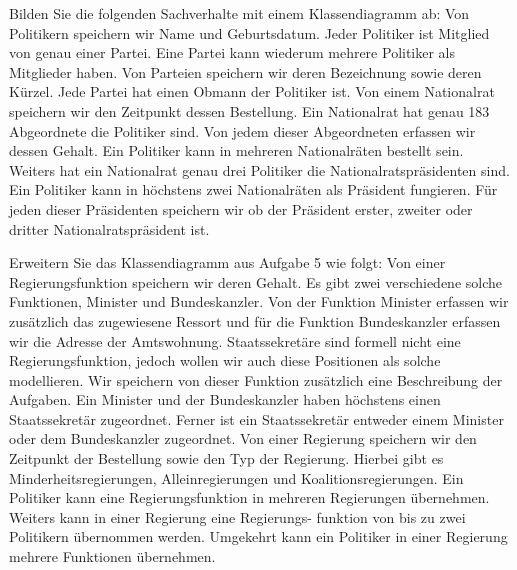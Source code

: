 \documentclass[a4paper, 12pt, margins=2cm]{homework}
\begin{document}
  \begin{problem}
    Bilden Sie die folgenden Sachverhalte mit einem Klassendiagramm ab:
Von Politikern speichern wir Name und Geburtsdatum. Jeder Politiker ist Mitglied von genau einer Partei. Eine
Partei kann wiederum mehrere Politiker als Mitglieder haben. Von Parteien speichern wir deren Bezeichnung
sowie deren Kürzel. Jede Partei hat einen Obmann der Politiker ist. Von einem Nationalrat speichern wir den
Zeitpunkt dessen Bestellung. Ein Nationalrat hat genau 183 Abgeordnete die Politiker sind. Von jedem dieser
Abgeordneten erfassen wir dessen Gehalt. Ein Politiker kann in mehreren Nationalräten bestellt sein. Weiters
hat ein Nationalrat genau drei Politiker die Nationalratspräsidenten sind. Ein Politiker kann in höchstens zwei
Nationalräten als Präsident fungieren. Für jeden dieser Präsidenten speichern wir ob der Präsident erster, zweiter
oder dritter Nationalratspräsident ist.

Erweitern Sie das Klassendiagramm aus Aufgabe 5 wie folgt:
Von einer Regierungsfunktion speichern wir deren Gehalt. Es gibt zwei verschiedene solche Funktionen, Minister und Bundeskanzler. Von der Funktion Minister erfassen wir zusätzlich das zugewiesene Ressort und für
die Funktion Bundeskanzler erfassen wir die Adresse der Amtswohnung. Staatssekretäre sind formell nicht eine
Regierungsfunktion, jedoch wollen wir auch diese Positionen als solche modellieren. Wir speichern von dieser
Funktion zusätzlich eine Beschreibung der Aufgaben. Ein Minister und der Bundeskanzler haben höchstens
einen Staatssekretär zugeordnet. Ferner ist ein Staatssekretär entweder einem Minister oder dem Bundeskanzler
zugeordnet. Von einer Regierung speichern wir den Zeitpunkt der Bestellung sowie den Typ der Regierung.
Hierbei gibt es Minderheitsregierungen, Alleinregierungen und Koalitionsregierungen. Ein Politiker kann eine
Regierungsfunktion in mehreren Regierungen übernehmen. Weiters kann in einer Regierung eine Regierungs-
funktion von bis zu zwei Politikern übernommen werden. Umgekehrt kann ein Politiker in einer Regierung
mehrere Funktionen übernehmen.
  \end{problem}
\end{document}
